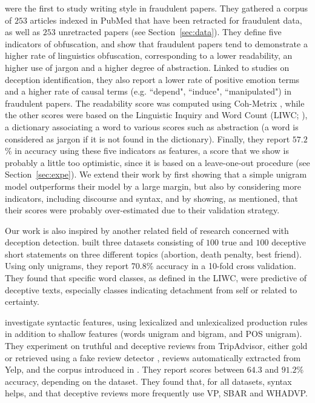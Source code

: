 \documentclass[11pt,letterpaper]{article}
\begin{document}
 were the first to study writing style in fraudulent papers.
They gathered a corpus of $253$ articles indexed in PubMed that have been retracted for fraudulent data, as well as $253$ unretracted papers (see Section~\ref{sec:data}).
They define five indicators of obfuscation, and show that fraudulent papers tend to demonstrate a higher rate of linguistics obfuscation, corresponding to a lower readability, an higher use of jargon and a higher degree of abstraction.
Linked to studies on deception identification, they also report a lower rate of positive emotion terms and a higher rate of causal terms (e.g. ``depend", ``induce", ``manipulated") in fraudulent papers.
The readability score was computed using Coh-Metrix \cite{mcnamara2013coh}, while the other scores were based on the Linguistic Inquiry and Word Count (LIWC; \cite{pennebaker2007linguistic}), a dictionary associating a word to various scores such as abstraction (a word is considered as jargon if it is not found in the dictionary). 
Finally, they report $57.2$\% in accuracy using these five indicators as features, a score that we show is probably a little too optimistic, since it is based on a leave-one-out procedure (see Section~\ref{sec:expe}).
We extend their work by first showing that a simple unigram model outperforms their model by a large margin, but also by considering more indicators, including discourse and syntax, and by showing, as mentioned, that their scores were probably over-estimated due to their validation strategy.

Our work is also inspired by another related field of research concerned with deception detection. 
built three datasets consisting of $100$ true and $100$ deceptive short statements on three different topics (abortion, death penalty, best friend).
Using only unigrams, they report 70.8\% accuracy in a 10-fold cross validation.
They found that specific word classes, as defined in the LIWC, were predictive of deceptive texts, especially classes indicating detachment from self or related to certainty. 

 investigate syntactic features, using lexicalized and unlexicalized production rules in addition to shallow features (words unigram and bigram, and POS unigram).
They experiment on truthful and deceptive reviews from TripAdvisor, either gold \cite{ott2011finding} or retrieved using a fake review detector \cite{feng2012distributional}, reviews automatically extracted from Yelp, 
and the corpus introduced in \cite{mihalcea2009lie}.
They report scores between $64.3$ and $91.2$\% accuracy, depending on the dataset.
They found that, for all datasets, syntax helps, and 
that deceptive reviews more frequently use VP, SBAR and WHADVP.
\end{document}
